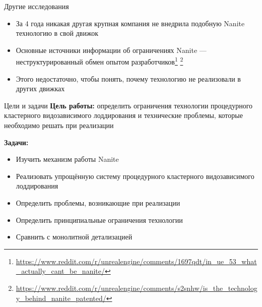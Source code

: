 \begin{frame}{Другие исследования}
    \begin{itemize}
        \item За 4 года никакая другая крупная компания не внедрила подобную Nanite технологию в свой движок
        \item Основные источники информации об ограничениях Nanite --- неструктурированный обмен опытом разработчиков\footnote{\url{https://www.reddit.com/r/unrealengine/comments/1697qdt/in_ue_53_what_actually_cant_be_nanite/}} \footnote{\url{https://www.reddit.com/r/unrealengine/comments/s2snhw/is_the_technology_behind_nanite_patented/}}
        \item Этого недостаточно, чтобы понять, почему технологию не реализовали в других движках
    \end{itemize}
\end{frame}

\begin{frame}{Цели и задачи}
    \textbf{Цель работы:}
    определить ограничения технологии процедурного кластерного видозависимого лоддирования и технические проблемы, которые необходимо решать при реализации

    \bigskip

    \textbf{Задачи:}
    \begin{itemize}
        \item Изучить механизм работы Nanite
        \item Реализовать упрощённую систему процедурного кластерного видозависимого лоддирования
        \item Определить проблемы, возникающие при реализации
        \item Определить принципиальные ограничения технологии
        \item Сравнить с монолитной детализацией
    \end{itemize}
\end{frame}
